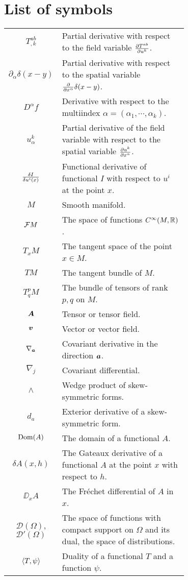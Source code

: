 \chapter*{List of symbols}
\noindent\vspace{-2\baselineskip}
{\renewcommand{\arraystretch}{1.3}
\begin{table}[h!]
    \begin{tabular}{c|p{0.7\linewidth}}
        $T^{ab}_{,k}$ & Partial derivative with respect to the field variable $\frac{\partial T^{ab}}{\partial u^k}$. \\
        $\partial_\alpha \delta(x-y)$ & Partial derivative with respect to the spatial variable $\frac{\partial }{\partial x^\alpha} \delta(x-y)$. \\
        $D^\alpha f$ & Derivative with respect to the multiindex $\alpha = (\alpha_1, \cdots, \alpha_k)$.\\
        $u^k_\alpha$ & Partial derivative of the field variable with respect to the spatial variable $\frac{\partial u^k}{\partial x^\alpha}$. \\
        $\frac{\delta I}{\delta u^i(x)}$ & Functional derivative of functional $I$ with respect to $u^i$ at the point $x$. \\
        $M$ & Smooth manifold. \\
        $\mathcal{F} M$ & The space of functions $C^\infty(M, \mathbb{R})$. \\
        $T_x M$ & The tangent space of the point $x \in M$. \\
        $TM$ & The tangent bundle of $M$. \\
        $T^p_q M$ & The bundle of tensors of rank $p,q$ on $M$. \\
        $\boldsymbol{A}$ & Tensor or tensor field. \\
        $\boldsymbol{v}$ & Vector or vector field. \\
        $\nabla_{\boldsymbol{a}}$ & Covariant derivative in the direction $\boldsymbol{a}$. \\
        $\nabla_j$ & Covariant differential. \\
        $\wedge$ & Wedge product of skew-symmetric forms. \\
        $d_a$ & Exterior derivative of a skew-symmetric form. \\
        $\mathrm{Dom}(A)$ & The domain of a functional $A$. \\
        $\delta A(x,h)$ & The Gateaux derivative of a functional $A$ at the point $x$ with respect to $h$. \\
        $\DD_x A$ & The Fréchet differential of $A$ in $x$. \\
        $\mathcal{D}(\Omega)$, $\mathcal{D}'(\Omega)$ & The space of functions with compact support on $\Omega$ and its dual, the space of distributions. \\
        $\left \langle T ,\psi \right \rangle$ & Duality of a functional $T$ and a function $\psi$.
    \end{tabular}
\end{table}
}

